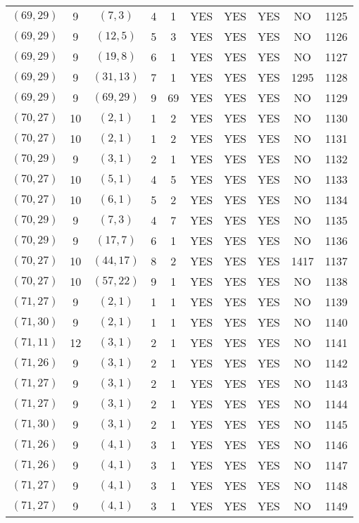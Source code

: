 \begin{longtable}{|c|c|c|c|c|c|c|c|c|c|}
$(69, 29)$ & 9 & $(7, 3)$ & 4 & 1 & YES & YES & YES & NO & 1125\\
$(69, 29)$ & 9 & $(12, 5)$ & 5 & 3 & YES & YES & YES & NO & 1126\\
$(69, 29)$ & 9 & $(19, 8)$ & 6 & 1 & YES & YES & YES & NO & 1127\\
$(69, 29)$ & 9 & $(31, 13)$ & 7 & 1 & YES & YES & YES & 1295 & 1128\\
$(69, 29)$ & 9 & $(69, 29)$ & 9 & 69 & YES & YES & YES & NO & 1129\\
$(70, 27)$ & 10 & $(2, 1)$ & 1 & 2 & YES & YES & YES & NO & 1130\\
$(70, 27)$ & 10 & $(2, 1)$ & 1 & 2 & YES & YES & YES & NO & 1131\\
$(70, 29)$ & 9 & $(3, 1)$ & 2 & 1 & YES & YES & YES & NO & 1132\\
$(70, 27)$ & 10 & $(5, 1)$ & 4 & 5 & YES & YES & YES & NO & 1133\\
$(70, 27)$ & 10 & $(6, 1)$ & 5 & 2 & YES & YES & YES & NO & 1134\\
$(70, 29)$ & 9 & $(7, 3)$ & 4 & 7 & YES & YES & YES & NO & 1135\\
$(70, 29)$ & 9 & $(17, 7)$ & 6 & 1 & YES & YES & YES & NO & 1136\\
$(70, 27)$ & 10 & $(44, 17)$ & 8 & 2 & YES & YES & YES & 1417 & 1137\\
$(70, 27)$ & 10 & $(57, 22)$ & 9 & 1 & YES & YES & YES & NO & 1138\\
$(71, 27)$ & 9 & $(2, 1)$ & 1 & 1 & YES & YES & YES & NO & 1139\\
$(71, 30)$ & 9 & $(2, 1)$ & 1 & 1 & YES & YES & YES & NO & 1140\\
$(71, 11)$ & 12 & $(3, 1)$ & 2 & 1 & YES & YES & YES & NO & 1141\\
$(71, 26)$ & 9 & $(3, 1)$ & 2 & 1 & YES & YES & YES & NO & 1142\\
$(71, 27)$ & 9 & $(3, 1)$ & 2 & 1 & YES & YES & YES & NO & 1143\\
$(71, 27)$ & 9 & $(3, 1)$ & 2 & 1 & YES & YES & YES & NO & 1144\\
$(71, 30)$ & 9 & $(3, 1)$ & 2 & 1 & YES & YES & YES & NO & 1145\\
$(71, 26)$ & 9 & $(4, 1)$ & 3 & 1 & YES & YES & YES & NO & 1146\\
$(71, 26)$ & 9 & $(4, 1)$ & 3 & 1 & YES & YES & YES & NO & 1147\\
$(71, 27)$ & 9 & $(4, 1)$ & 3 & 1 & YES & YES & YES & NO & 1148\\
$(71, 27)$ & 9 & $(4, 1)$ & 3 & 1 & YES & YES & YES & NO & 1149\\

\end{longtable}
